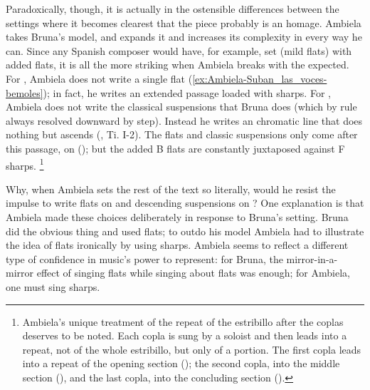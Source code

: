 Paradoxically, though, it is actually in the ostensible differences between the settings where it becomes clearest that the piece probably is an homage.
Ambiela takes Bruna's model, and expands it and increases its complexity in every way he can.
Since any Spanish composer would have, for example, set  (mild flats) with added flats, it is all the more striking when Ambiela breaks with the expected.
For , Ambiela does not write a single flat (\cref{ex:Ambiela-Suban_las_voces-bemoles}); in fact, he writes an extended passage loaded with sharps.
For , Ambiela does not write the classical suspensions that Bruna does (which by rule always resolved downward by step). 
Instead he writes an chromatic line that does nothing but ascends (, Ti. I-2).
The flats and classic suspensions only come after this passage, on  (); but the added B flats are constantly juxtaposed against F sharps.%
	\footnote{%
	Ambiela's unique treatment of the repeat of the estribillo after the coplas deserves to be noted.
Each copla is sung by a soloist and then leads into a repeat, not of the whole estribillo, but only of a portion.
The first copla leads into a repeat of the opening section (); the second copla, into the middle section (), and the last copla, into the concluding section ().
	}

% 

Why, when Ambiela sets the rest of the text so literally, would he resist the impulse to write flats on  and descending suspensions on ?
One explanation is that Ambiela made these choices deliberately in response to Bruna's setting. 
Bruna did the obvious thing and used flats; to outdo his model Ambiela had to illustrate the idea of flats ironically by using sharps. 
Ambiela seems to reflect a different type of confidence in music's power to represent: for Bruna, the mirror-in-a-mirror effect of singing flats while singing about flats was enough; for Ambiela, one must sing sharps. 

